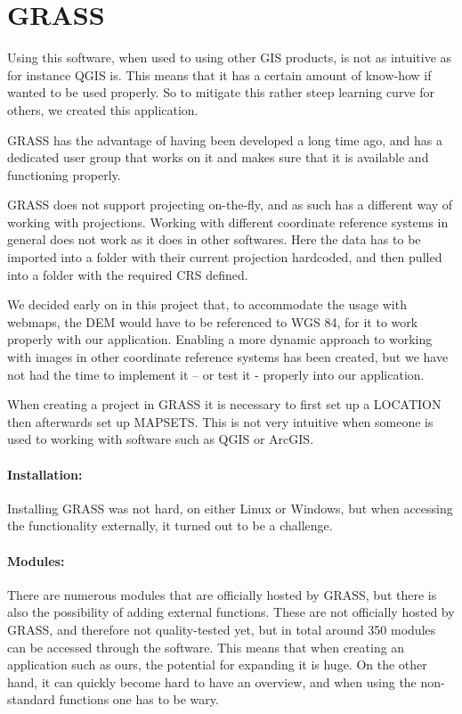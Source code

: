 \section{GRASS}
Using this software, when used to using other GIS products, is not as intuitive as for instance QGIS is. This means that it has a certain amount of know-how if wanted to be used properly. So to mitigate this rather steep learning curve for others, we created this application. 

GRASS has the advantage of having been developed a long time ago, and has a dedicated user group that works on it and makes sure that it is available and  functioning properly.

GRASS does not support projecting on-the-fly, and as such has a different way of working with projections. Working with different coordinate reference systems in general does not work as it does in other softwares. Here the data has to be imported into a folder with their current projection hardcoded, and then pulled into a folder with the required CRS defined. 

We decided early on in this project that, to accommodate the usage with webmaps, the DEM would have to be referenced to WGS 84, for it to work properly with our application.
Enabling a more dynamic approach to working with images in other coordinate reference systems has been created, but we have not had the time to implement it – or test it - properly into our application.

When creating a project in GRASS it is necessary to first set up a LOCATION then afterwards set up MAPSETS. This is not very intuitive when someone is used to working with software such as QGIS or ArcGIS.

\paragraph{Installation:} Installing GRASS was not hard, on either Linux or Windows, but when accessing the functionality externally, it turned out to be a challenge.

\paragraph{Modules:} There are numerous modules that are officially hosted by GRASS, but there is also the possibility of adding external functions. These are not officially hosted by GRASS, and therefore not quality-tested yet, but in total around 350 modules can be accessed through the software. This means that when creating an application such as ours, the potential for expanding it is huge. On the other hand, it can quickly become hard to have an overview, and when using the non-standard functions one has to be wary.

